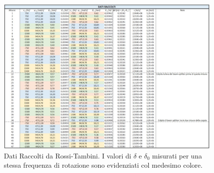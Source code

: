 \documentclass{article}
\begin{document}
\begin{figure}[h]
    \centering
    \includegraphics[width=1.0\linewidth]{RT_DatiRaccolti.JPG}
    \caption{Dati Raccolti da Rossi-Tambini. I valori di $\delta$ e $\delta_0$ misurati per una stessa frequenza di rotazione sono evidenziati col medesimo colore.}
    \label{RT_DatiRaccolti}
\end{figure}
\end{document}
